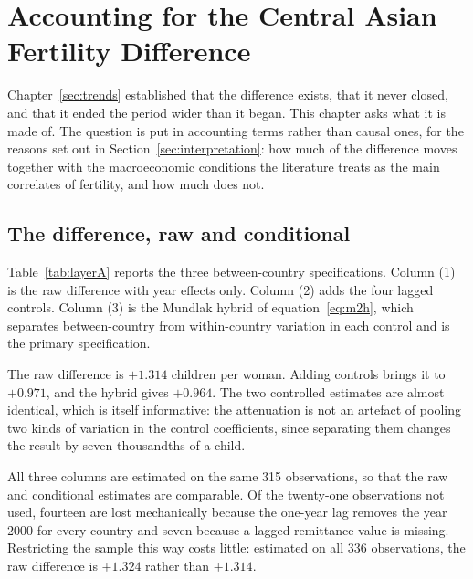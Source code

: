 
\section{Accounting for the Central Asian Fertility Difference}
\label{sec:premium}

Chapter~\ref{sec:trends} established that the difference exists, that it never closed, and that it ended the period wider than it began. This chapter asks what it is made of. The question is put in accounting terms rather than causal ones, for the reasons set out in Section~\ref{sec:interpretation}: how much of the difference moves together with the macroeconomic conditions the literature treats as the main correlates of fertility, and how much does not.

\subsection{The difference, raw and conditional}
\label{sec:raw-conditional}

Table~\ref{tab:layerA} reports the three between-country specifications. Column (1) is the raw difference with year effects only. Column (2) adds the four lagged controls. Column (3) is the Mundlak hybrid of equation~\eqref{eq:m2h}, which separates between-country from within-country variation in each control and is the primary specification.



The raw difference is $+1.314$ children per woman. Adding controls brings it to $+0.971$, and the hybrid gives $+0.964$. The two controlled estimates are almost identical, which is itself informative: the attenuation is not an artefact of pooling two kinds of variation in the control coefficients, since separating them changes the result by seven thousandths of a child.

All three columns are estimated on the same 315 observations, so that the raw and conditional estimates are comparable. Of the twenty-one observations not used, fourteen are lost mechanically because the one-year lag removes the year 2000 for every country and seven because a lagged remittance value is missing. Restricting the sample this way costs little: estimated on all 336 observations, the raw difference is $+1.324$ rather than $+1.314$.

